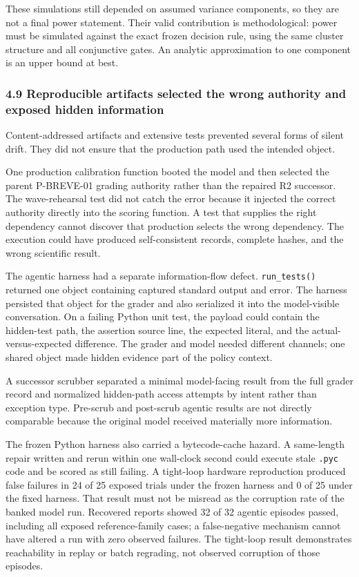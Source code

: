 \documentclass[
  9pt,
  letterpaper,
]{article}
\begin{document}
These simulations still depended on assumed variance components, so they
are not a final power statement. Their valid contribution is
methodological: power must be simulated against the exact frozen
decision rule, using the same cluster structure and all conjunctive
gates. An analytic approximation to one component is an upper bound at
best.

\hypertarget{49-reproducible-artifacts-selected-the-wrong-authority-and-exposed-hidden-information}{%
\subsubsection{4.9 Reproducible artifacts selected the wrong authority
and exposed hidden
information}\label{49-reproducible-artifacts-selected-the-wrong-authority-and-exposed-hidden-information}}

Content-addressed artifacts and extensive tests prevented several forms
of silent drift. They did not ensure that the production path used the
intended object.

One production calibration function booted the model and then selected
the parent P-BREVE-01 grading authority rather than the repaired R2
successor. The wave-rehearsal test did not catch the error because it
injected the correct authority directly into the scoring function. A
test that supplies the right dependency cannot discover that production
selects the wrong dependency. The execution could have produced
self-consistent records, complete hashes, and the wrong scientific
result.

The agentic harness had a separate information-flow defect.
\texttt{run\_tests()} returned one object containing captured standard
output and error. The harness persisted that object for the grader and
also serialized it into the model-visible conversation. On a failing
Python unit test, the payload could contain the hidden-test path, the
assertion source line, the expected literal, and the
actual-versus-expected difference. The grader and model needed different
channels; one shared object made hidden evidence part of the policy
context.

A successor scrubber separated a minimal model-facing result from the
full grader record and normalized hidden-path access attempts by intent
rather than exception type. Pre-scrub and post-scrub agentic results are
not directly comparable because the original model received materially
more information.

The frozen Python harness also carried a bytecode-cache hazard. A
same-length repair written and rerun within one wall-clock second could
execute stale \texttt{.pyc} code and be scored as still failing. A
tight-loop hardware reproduction produced false failures in 24 of 25
exposed trials under the frozen harness and 0 of 25 under the fixed
harness. That result must not be misread as the corruption rate of the
banked model run. Recovered reports showed 32 of 32 agentic episodes
passed, including all exposed reference-family cases; a false-negative
mechanism cannot have altered a run with zero observed failures. The
tight-loop result demonstrates reachability in replay or batch
regrading, not observed corruption of those episodes.
\end{document}
